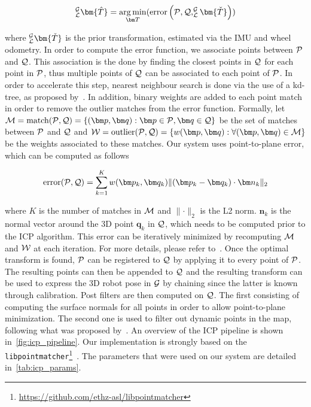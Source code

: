 \begin{equation}
	_{\lidarf}^{\mapf}\bm{\hat{T}} = \argmin_{\bm T} (\text{error} \left(\readpc, \refpc, _{\lidarf}^{\mapf}\bm{\check{T}} \right))
\end{equation}

where $_{\lidarf}^{\mapf}\bm{\check{T}}$ is the prior transformation, estimated via the \ac{IMU} and wheel odometry.
In order to compute the error function, we associate points between $\mathcal{P}$ and $\mathcal{Q}$.
This association is the done by finding the closest points in $\mathcal{Q}$ for each point in $\mathcal{P}$, thus multiple points of $\mathcal{Q}$ can be associated to each point of $\mathcal{P}$.
In order to accelerate this step, nearest neighbour search is done via the use of a kd-tree, as proposed by~\citet{Elseberg2012}.
In addition, binary weights are added to each point match in order to remove the outlier matches from the error function.
Formally, let $\match = \text{match}(\readpc, \refpc) = \{(\bm p, \bm q) : \bm p \in \readpc, \bm q \in \refpc \}$ be the set of matches between $\mathcal{P}$ and $\mathcal{Q}$ and $\weight = \text{outlier}(\readpc, \refpc) = \{w(\bm p, \bm q) : \forall(\bm p, \bm q) \in \match\}$ be the weights associated to these matches.
Our system uses point-to-plane error, which can be computed as follows

\begin{equation}
	\text{error}(\readpc, \refpc) = \sum_{k=1}^{K} w(\bm p_k, \bm q_k) \lVert (\bm p_k - \bm q_k) \cdot \bm n_k \rVert_2
\end{equation}

where $K$ is the number of matches in $\mathcal{M}$ and $\lVert \cdot \rVert_2$ is the L2 norm. 
$\bm n_k$ is the normal vector around the 3D point $\bm q_k$ in $\mathcal{Q}$, which needs to be computed prior to the \ac{ICP} algorithm.
This error can be iteratively minimized by recomputing $\mathcal{M}$ and $\mathcal{W}$ at each iteration.
For more details, please refer to~\citep{Pomerleau2015}.
Once the optimal transform is found, $\mathcal{P}$ can be registered to $\mathcal{Q}$ by applying it to every point of $\mathcal{P}$. 
The resulting points can then be appended to $\mathcal{Q}$ and the resulting transform \transform{\lidarf}{\mapf} can be used to express the 3D robot pose in $\mathcal{G}$ by chaining \transform{\lidarf}{\mapf} \transform{\robotf}{\lidarf} since the latter is known through calibration.
Post filters are then computed on $\mathcal{Q}$. 
The first consisting of computing the surface normals for all points in order to allow point-to-plane minimization.
The second one is used to filter out dynamic points in the map, following what was proposed by~\citet{Pomerleau2014}.
An overview of the \ac{ICP} pipeline is shown in~\autoref{fig:icp_pipeline}.
Our implementation is strongly based on the \texttt{libpointmatcher}\footnote{\url{https://github.com/ethz-asl/libpointmatcher}}~\citep{Pomerleau2013}.
The parameters that were used on our system are detailed in~\autoref{tab:icp_params}.

